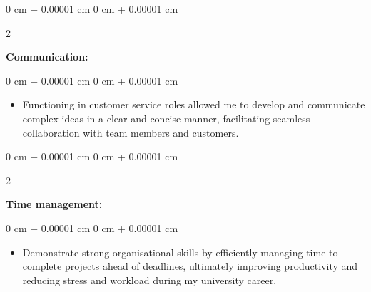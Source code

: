\documentclass[10pt, letterpaper]{article}
\newenvironment{highlights}{
    \begin{itemize}[
        topsep=0.10 cm,
        parsep=0.10 cm,
        partopsep=0pt,
        itemsep=0pt,
        leftmargin=0 cm + 10pt
    ]
}{
    \end{itemize}
} %
\newenvironment{onecolentry}{
    \begin{adjustwidth}{
        0 cm + 0.00001 cm
    }{
        0 cm + 0.00001 cm
    }
}{
    \end{adjustwidth}
} %
\newenvironment{twocolentry}[2][]{
    \onecolentry
    \def\secondColumn{#2}
    \setcolumnwidth{\fill, 4.5 cm}
    \begin{paracol}{2}
}{
    \switchcolumn \raggedleft \secondColumn
    \end{paracol}
    \endonecolentry
} %
\begin{document}
        \begin{twocolentry}{
            
        }
            \textbf{Communication:}\end{twocolentry}

        \vspace{-0.05 cm}
        \begin{onecolentry}
            \begin{highlights}
                \item Functioning in customer service roles allowed me to develop and communicate complex ideas in a clear and concise manner, facilitating seamless collaboration with team members and customers. 
                
            \end{highlights}
        \end{onecolentry}
              \vspace{0.2 cm}

        \begin{twocolentry}{
            
        }
            \textbf{Time management:}\end{twocolentry}

        \vspace{-0.05 cm}
        \begin{onecolentry}
            \begin{highlights}
                \item Demonstrate strong organisational skills by efficiently managing time to complete projects ahead of deadlines, ultimately improving productivity and reducing stress and workload during my university career. 
                
            \end{highlights}
        \end{onecolentry}
        

       


        
\end{document}
